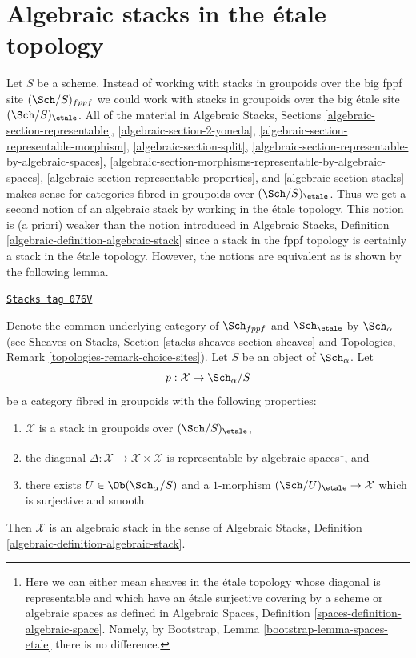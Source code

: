 \section{Algebraic stacks in the \'etale topology}
\label{criteria-section-stacks-etale}
Let $S$ be a scheme. Instead of working with stacks in groupoids over
the big fppf site $(\Sch/S)_{fppf}$ we could work with stacks in groupoids
over the big \'etale site $(\Sch/S)_\etale$. All of the material in
Algebraic Stacks, Sections
\ref{algebraic-section-representable},
\ref{algebraic-section-2-yoneda},
\ref{algebraic-section-representable-morphism},
\ref{algebraic-section-split},
\ref{algebraic-section-representable-by-algebraic-spaces},
\ref{algebraic-section-morphisms-representable-by-algebraic-spaces},
\ref{algebraic-section-representable-properties}, and
\ref{algebraic-section-stacks}
makes sense for categories fibred in groupoids over $(\Sch/S)_\etale$.
Thus we get a second notion of an algebraic stack by working in the
\'etale topology. This notion is (a priori) weaker than the notion introduced
in Algebraic Stacks, Definition \ref{algebraic-definition-algebraic-stack}
since a stack in the fppf topology is certainly a stack in the \'etale
topology. However, the notions are equivalent as is shown by the following
lemma.

\begin{lemma}
\label{criteria-lemma-stacks-etale}
\href{https://stacks.math.columbia.edu/tag/076V}{\texttt{Stacks tag 076V}}

Denote the common underlying category of $\Sch_{fppf}$
and $\Sch_\etale$ by $\Sch_\alpha$ (see
Sheaves on Stacks, Section \ref{stacks-sheaves-section-sheaves} and
Topologies, Remark \ref{topologies-remark-choice-sites}). Let $S$ be an object
of $\Sch_\alpha$. Let
$$
p : \mathcal{X} \to \Sch_\alpha/S
$$
be a category fibred in groupoids with the following properties:
\begin{enumerate}
\item $\mathcal{X}$ is a stack in groupoids over $(\Sch/S)_\etale$,
\item the diagonal $\Delta : \mathcal{X} \to \mathcal{X} \times \mathcal{X}$
is representable by algebraic spaces\footnote{Here we can either mean
sheaves in the \'etale topology whose diagonal is representable and which
have an \'etale surjective covering by a scheme or algebraic spaces as
defined in
Algebraic Spaces, Definition \ref{spaces-definition-algebraic-space}.
Namely, by Bootstrap, Lemma \ref{bootstrap-lemma-spaces-etale}
there is no difference.}, and
\item there exists $U \in \Ob(\Sch_\alpha/S)$
and a $1$-morphism $(\Sch/U)_\etale \to \mathcal{X}$
which is surjective and smooth.
\end{enumerate}
Then $\mathcal{X}$ is an algebraic stack in the sense of
Algebraic Stacks, Definition \ref{algebraic-definition-algebraic-stack}.
\end{lemma}

